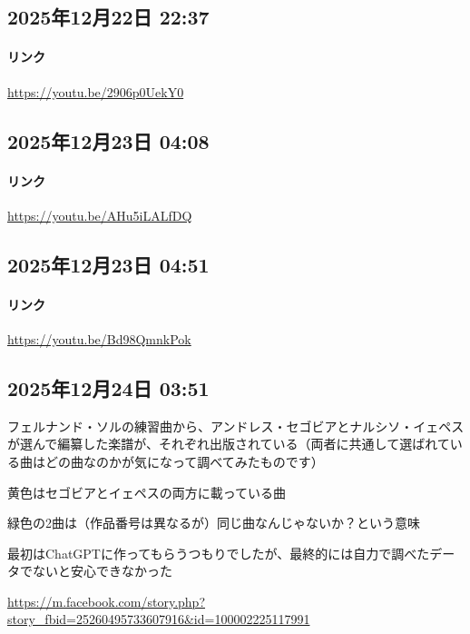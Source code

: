 \subsection*{2025年12月22日 22:37}

\paragraph{リンク}
\url{https://youtu.be/2906p0UekY0}

\subsection*{2025年12月23日 04:08}

\paragraph{リンク}
\url{https://youtu.be/AHu5iLALfDQ}

\subsection*{2025年12月23日 04:51}

\paragraph{リンク}
\url{https://youtu.be/Bd98QmnkPok}

\subsection*{2025年12月24日 03:51}

フェルナンド・ソルの練習曲から、アンドレス・セゴビアとナルシソ・イェペスが選んで編纂した楽譜が、それぞれ出版されている（両者に共通して選ばれている曲はどの曲なのかが気になって調べてみたものです）

黄色はセゴビアとイェペスの両方に載っている曲

緑色の2曲は（作品番号は異なるが）同じ曲なんじゃないか？という意味

最初はChatGPTに作ってもらうつもりでしたが、最終的には自力で調べたデータでないと安心できなかった

\url{https://m.facebook.com/story.php?story_fbid=25260495733607916&id=100002225117991}

